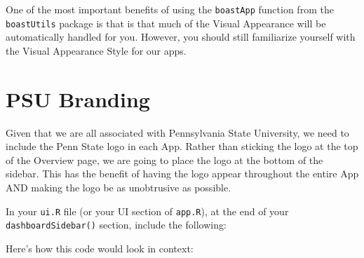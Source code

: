 \documentclass[]{book}
\newenvironment{Shaded}{\begin{snugshade}}{\end{snugshade}}
\newcommand{\CommentTok}[1]{\textcolor[rgb]{0.56,0.35,0.01}{\textit{#1}}}
\newcommand{\DataTypeTok}[1]{\textcolor[rgb]{0.13,0.29,0.53}{#1}}
\newcommand{\DecValTok}[1]{\textcolor[rgb]{0.00,0.00,0.81}{#1}}
\newcommand{\KeywordTok}[1]{\textcolor[rgb]{0.13,0.29,0.53}{\textbf{#1}}}
\newcommand{\NormalTok}[1]{#1}
\newcommand{\OperatorTok}[1]{\textcolor[rgb]{0.81,0.36,0.00}{\textbf{#1}}}
\newcommand{\StringTok}[1]{\textcolor[rgb]{0.31,0.60,0.02}{#1}}
\begin{document}
One of the most important benefits of using the \texttt{boastApp} function from the \texttt{boastUtils} package is that is that much of the Visual Appearance will be automatically handled for you. However, you should still familiarize yourself with the Visual Appearance Style for our apps.

\hypertarget{logo}{%
\section{PSU Branding}\label{logo}}

Given that we are all associated with Pennsylvania State University, we need to include the Penn State logo in each App. Rather than sticking the logo at the top of the Overview page, we are going to place the logo at the bottom of the sidebar. This has the benefit of having the logo appear throughout the entire App AND making the logo be as unobtrusive as possible.

In your \texttt{ui.R} file (or your UI section of \texttt{app.R}), at the end of your \texttt{dashboardSidebar()} section, include the following:

\begin{Shaded}
\end{Shaded}

Here's how this code would look in context:

\begin{Shaded}
\end{Shaded}
\end{document}
